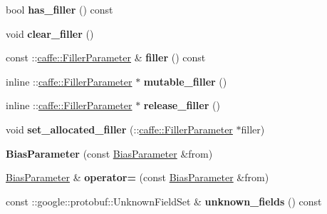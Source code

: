 \begin{DoxyCompactItemize}
bool {\bfseries has\+\_\+filler} () const
\item 
\mbox{\label{classcaffe_1_1_bias_parameter_a965f8ab3974de8c91cbe859b58e4dc67}} 
void {\bfseries clear\+\_\+filler} ()
\item 
\mbox{\label{classcaffe_1_1_bias_parameter_ab5b741d4233460270758acce5387edb5}} 
const \+::\mbox{\hyperlink{classcaffe_1_1_filler_parameter}{caffe\+::\+Filler\+Parameter}} \& {\bfseries filler} () const
\item 
\mbox{\label{classcaffe_1_1_bias_parameter_a43dbedfad4af2987b1ba8a004800e70f}} 
inline \+::\mbox{\hyperlink{classcaffe_1_1_filler_parameter}{caffe\+::\+Filler\+Parameter}} $\ast$ {\bfseries mutable\+\_\+filler} ()
\item 
\mbox{\label{classcaffe_1_1_bias_parameter_a6fd8a4f2aff912e70cd67936833ca5ea}} 
inline \+::\mbox{\hyperlink{classcaffe_1_1_filler_parameter}{caffe\+::\+Filler\+Parameter}} $\ast$ {\bfseries release\+\_\+filler} ()
\item 
\mbox{\label{classcaffe_1_1_bias_parameter_a0d21642db0d36d01187ece40ba4e9b26}} 
void {\bfseries set\+\_\+allocated\+\_\+filler} (\+::\mbox{\hyperlink{classcaffe_1_1_filler_parameter}{caffe\+::\+Filler\+Parameter}} $\ast$filler)
\item 
\mbox{\label{classcaffe_1_1_bias_parameter_a5b4867daac981eba3569149309faa602}} 
{\bfseries Bias\+Parameter} (const \mbox{\hyperlink{classcaffe_1_1_bias_parameter}{Bias\+Parameter}} \&from)
\item 
\mbox{\label{classcaffe_1_1_bias_parameter_a8e373dfbcb6e761d205f95fe319be59f}} 
\mbox{\hyperlink{classcaffe_1_1_bias_parameter}{Bias\+Parameter}} \& {\bfseries operator=} (const \mbox{\hyperlink{classcaffe_1_1_bias_parameter}{Bias\+Parameter}} \&from)
\item 
\mbox{\label{classcaffe_1_1_bias_parameter_a257f42aeffb3467c4fabbee7919dd001}} 
const \+::google\+::protobuf\+::\+Unknown\+Field\+Set \& {\bfseries unknown\+\_\+fields} () const

\end{DoxyCompactItemize}
